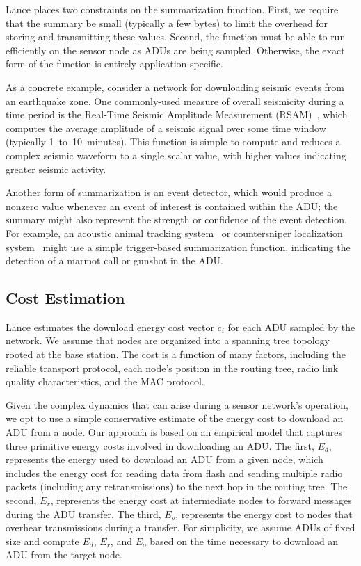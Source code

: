 Lance places two constraints on the summarization function. First, we require
that the summary be small (typically a few bytes) to limit the overhead for
storing and transmitting these values. Second, the function must be able to
run efficiently on the sensor node as ADUs are being sampled. Otherwise, the
exact form of the function is entirely application-specific.

As a concrete example, consider a network for downloading seismic events from
an earthquake zone. One commonly-used measure of overall seismicity during a
time period is the Real-Time Seismic Amplitude Measurement
(RSAM)~\cite{rsam}, which computes the average amplitude of a seismic signal
over some time window (typically 1~to~10~minutes). This function is simple to
compute and reduces a complex seismic waveform to a single scalar value, with
higher values indicating greater seismic activity.

Another form of summarization is an event detector, which would produce a
nonzero value whenever an event of interest is contained within the ADU; the
summary might also represent the strength or confidence of the event
detection. For example, an acoustic animal tracking
system~\cite{girod-ipsn07} or countersniper localization
system~\cite{shooter-localization} might use a simple trigger-based
summarization function, indicating the detection of a marmot call or gunshot
in the ADU.

\subsection{Cost Estimation}
\label{lance-subsec-costestimation}

Lance estimates the download energy cost vector $\bar{c}_i$ for each ADU
sampled by the network. We assume that nodes are organized into a spanning
tree topology rooted at the base station. The cost is a function of many
factors, including the reliable transport protocol, each node's position in
the routing tree, radio link quality characteristics, and the MAC protocol.

Given the complex dynamics that can arise during a sensor network's
operation, we opt to use a simple conservative estimate of the energy cost to
download an ADU from a node. Our approach is based on an empirical model that
captures three primitive energy costs involved in downloading an ADU. The
first, $E_d$, represents the energy used to download an ADU from a given
node, which includes the energy cost for reading data from flash and sending
multiple radio packets (including any retransmissions) to the next hop in the
routing tree. The second, $E_r$, represents the energy cost at intermediate
nodes to forward messages during the ADU transfer. The third, $E_o$,
represents the energy cost to nodes that overhear transmissions during a
transfer. For simplicity, we assume ADUs of fixed size and compute $E_d$,
$E_r$, and $E_o$ based on the time necessary to download an ADU from the
target node.

